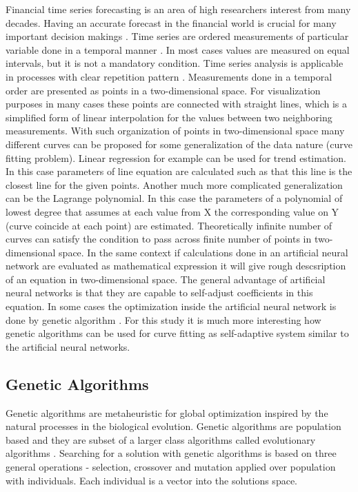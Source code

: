 \documentclass[graybox]{svmult}
\begin{document}
Financial time series forecasting is an area of high researchers interest \cite{nava01} from many decades. Having an accurate forecast in the financial world is crucial for many important decision makings \cite{catania01}. Time series are ordered measurements of particular variable done in a temporal manner \cite{chen01}. In most cases values are measured on equal intervals, but it is not a mandatory condition. Time series analysis is applicable in processes with clear repetition pattern \cite{mueen01}. Measurements done in a temporal order are presented as points in a two-dimensional space. For visualization purposes in many cases these points are connected with straight lines, which is a simplified form of linear interpolation for the values between two neighboring measurements. With such organization of points in two-dimensional space many different curves can be proposed for some generalization of the data nature (curve fitting problem). Linear regression for example can be used for trend estimation. In this case parameters of line equation are calculated such as that this line is the closest line for the given points. Another much more complicated generalization can be the Lagrange polynomial. In this case the parameters of a polynomial of lowest degree that assumes at each value from X the corresponding value on Y (curve coincide at each point) are estimated. Theoretically infinite number of curves can satisfy the condition to pass across finite number of points in two-dimensional space. In the same context if calculations done in an artificial neural network are evaluated as mathematical expression it will give rough descsription of an equation in two-dimensional space. The general advantage of artificial neural networks is that they are capable to self-adjust coefficients \cite{aljarah01} in this equation. In some cases the optimization inside the artificial neural network is done by genetic algorithm \cite{zhang01,kapanova01}. For this study it is much more interesting how genetic algorithms can be used for curve fitting as self-adaptive system similar to the artificial neural networks. 

\subsection{Genetic Algorithms} \label{Genetic Algorithms}

Genetic algorithms are metaheuristic for global optimization inspired by the natural processes in the biological evolution. Genetic algorithms are population based \cite{mirjalili01} and they are subset of a larger class algorithms called evolutionary algorithms \cite{liu01}. Searching for a solution with genetic algorithms is based on three general operations - selection, crossover and mutation applied over population with individuals. Each individual is a vector into the solutions space. 
\end{document}
